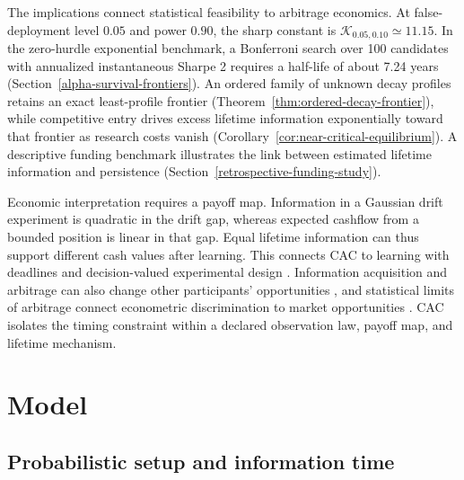 \documentclass[11pt]{article}
\numberwithin{equation}{section}
\theoremstyle{plain}
\theoremstyle{definition}
\theoremstyle{remark}
\begin{document}
The implications connect statistical feasibility to arbitrage economics. At false-deployment level $0.05$ and power $0.90$, the sharp constant is $\mathcal K_{0.05,0.10}\simeq11.15$. In the zero-hurdle exponential benchmark, a Bonferroni search over 100 candidates with annualized instantaneous Sharpe 2 requires a half-life of about 7.24 years (Section~\ref{alpha-survival-frontiers}). An ordered family of unknown decay profiles retains an exact least-profile frontier (Theorem~\ref{thm:ordered-decay-frontier}), while competitive entry drives excess lifetime information exponentially toward that frontier as research costs vanish (Corollary~\ref{cor:near-critical-equilibrium}). A descriptive funding benchmark illustrates the link between estimated lifetime information and persistence (Section~\ref{retrospective-funding-study}).

Economic interpretation requires a payoff map. Information in a Gaussian drift experiment is quadratic in the drift gap, whereas expected cashflow from a bounded position is linear in that gap. Equal lifetime information can thus support different cash values after learning. This connects CAC to learning with deadlines and decision-valued experimental design \cite{frazier2007deadline,dayanik2013deadline,campbell2026deadline,anand2010,zhong2026}. Information acquisition and arbitrage can also change other participants' opportunities \cite{grossmanstiglitz1980,basakcroitoru2006,zigrand2004,zigrand2006}, and statistical limits of arbitrage connect econometric discrimination to market opportunities \cite{danagelxiu2024}. CAC isolates the timing constraint within a declared observation law, payoff map, and lifetime mechanism.

\section{Model}\label{model-and-information-time}

\subsection{Probabilistic setup and information time}\label{probabilistic-setup}
\end{document}
